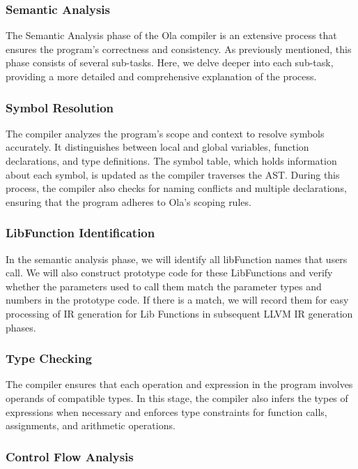 
\subsubsection{Semantic Analysis}

The Semantic Analysis phase of the Ola compiler is an extensive process that ensures the program's correctness and consistency. As previously mentioned, this phase consists of several sub-tasks. Here, we delve deeper into each sub-task, providing a more detailed and comprehensive explanation of the process.

\subsubsection*{Symbol Resolution}

The compiler analyzes the program's scope and context to resolve symbols accurately. It distinguishes between local and global variables, function declarations, and type definitions. The symbol table, which holds information about each symbol, is updated as the compiler traverses the AST. During this process, the compiler also checks for naming conflicts and multiple declarations, ensuring that the program adheres to Ola's scoping rules.

\subsubsection*{LibFunction Identification}

In the semantic analysis phase, we will identify all libFunction names that users call. We will also construct prototype code for these LibFunctions and verify whether the parameters used to call them match the parameter types and numbers in the prototype code. If there is a match, we will record them for easy processing of IR generation for Lib Functions in subsequent LLVM IR generation phases.

\subsubsection*{Type Checking}

The compiler ensures that each operation and expression in the program involves operands of compatible types. In this stage, the compiler also infers the types of expressions when necessary and enforces type constraints for function calls, assignments, and arithmetic operations.

\subsubsection*{Control Flow Analysis}

